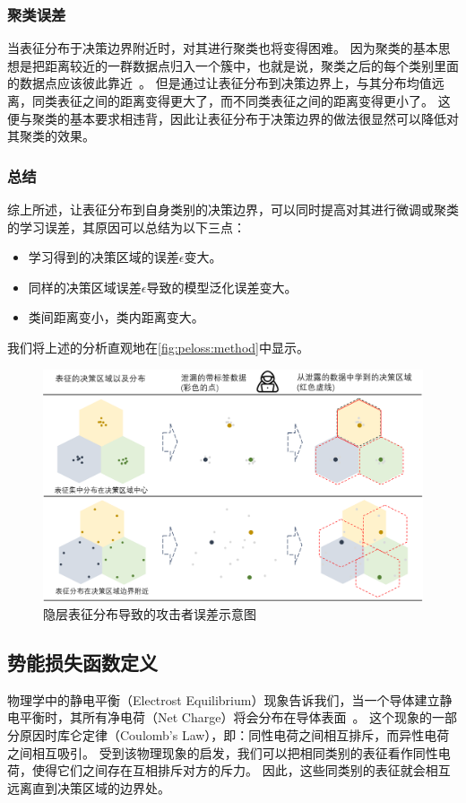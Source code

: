 %
\subsubsection{聚类误差}
当表征分布于决策边界附近时，对其进行聚类也将变得困难。
%
因为聚类的基本思想是把距离较近的一群数据点归入一个簇中，也就是说，聚类之后的每个类别里面的数据点应该彼此靠近~\cite{saxena2017cluster_review}。
%
但是通过让表征分布到决策边界上，与其分布均值远离，同类表征之间的距离变得更大了，而不同类表征之间的距离变得更小了。
%
这便与聚类的基本要求相违背，因此让表征分布于决策边界的做法很显然可以降低对其聚类的效果。


\subsubsection{总结}
综上所述，让表征分布到自身类别的决策边界，可以同时提高对其进行微调或聚类的学习误差，其原因可以总结为以下三点：
\begin{itemize}
    \item 学习得到的决策区域的误差$\epsilon$变大。
    \item 同样的决策区域误差$\epsilon$导致的模型泛化误差变大。
    \item 类间距离变小，类内距离变大。
\end{itemize}
我们将上述的分析直观地在\autoref{fig:peloss:method}中显示。

\begin{figure}[h!]
    \centering
    \includegraphics[width=1\linewidth]{Z_Resources/peloss_method.png}
    \caption{隐层表征分布导致的攻击者误差示意图}
    \label{fig:peloss:method}
\end{figure}


\subsection{势能损失函数定义}
物理学中的静电平衡（Electrost Equilibrium）现象告诉我们，当一个导体建立静电平衡时，其所有净电荷（Net Charge）将会分布在导体表面~\cite{griffiths2005introduction}。
%
这个现象的一部分原因时库仑定律（Coulomb's Law），即：同性电荷之间相互排斥，而异性电荷之间相互吸引。
%
受到该物理现象的启发，我们可以把相同类别的表征看作同性电荷，使得它们之间存在互相排斥对方的斥力。
因此，这些同类别的表征就会相互远离直到决策区域的边界处。
%

